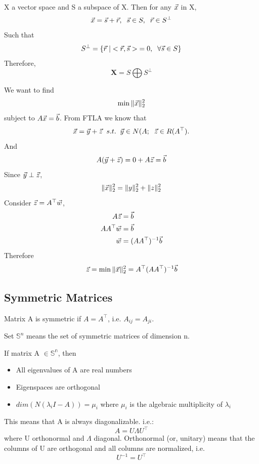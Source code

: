\begin{theorem}
X a vector space and S a subspace of X. Then for any $\vec{x}$ in X,
\[
\vec{x} = \vec{s} + \vec{r}, \;\; \vec{s} \in S,\;\; \vec{r} \in S^\perp
\]
Such that
\[
S^\perp = \{\vec{r}\;|<\vec{r}, \vec{s}>\;=0,\;\; \forall \vec{s}\in S\}
\]
Therefore, 
\[
\mathbf{X} = S\bigoplus S^\perp
\]
\end{theorem}

\begin{example}
	We want to find
	\[
\min \|\vec{x}\|_2^2
	\]
	subject to $A\vec{x}=\vec{b}$.
	From FTLA we know that
	\[
\vec{x} = \vec{y}+\vec{z}\;\;s.t.\;\;\vec{y}\in N(A;\;\;\vec{z}\in R(A^\top).
	\]
	And
	\[
A(\vec{y}+\vec{z}) = 0 + A\vec{z} = \vec{b}
	\]
	Since $\vec{y} \perp \vec{z}$,
	\[
\|\vec{x}\|_2^2 = \|y\|_2^2+\|z\|_2^2
	\]
	Consider $\vec{z} = A^\top\vec{w}$, 
	\begin{align*}
		A\vec{z} &= \vec{b}\\
		AA^\top\vec{w} &= \vec{b}\\
		\vec{w} &= (AA^\top)^{-1}\vec{b}
	\end{align*}
	Therefore
	\[
\vec{z} = \min{\|\vec{x}\|_2^2} =  A^\top(AA^\top)^{-1}\vec{b}
	\]
\end{example}


\subsection{Symmetric Matrices} %
\label{sub:symmetric_matrices}

\begin{definition}
	Matrix A is symmetric if $A=A^\top$, i.e. $A_{ij} = A_{ji}$. 

	Set $\mathbb{S}^n$ means the set of symmetric matrices of dimension n.
\end{definition}

\begin{theorem}
	If matrix A $\in \mathbb{S^n}$, then
	\begin{itemize}
		\item All eigenvalues of A are real numbers
		\item Eigenspaces are orthogonal
		\item $dim(N(\lambda_iI-A))=\mu_i$ where $\mu_i$ is the algebraic multiplicity of $\lambda_i$
	\end{itemize}
	This means that A is always diagonalizable. i.e.:
	\[
	A = U\Lambda U^\top
	\]
	where U orthonormal and $\Lambda$ diagonal. Orthonormal (or, unitary) means that the columns of U are orthogonal and all columns are normalized, i.e.
	\[
	U^{-1} = U^\top
	\]
\end{theorem}

